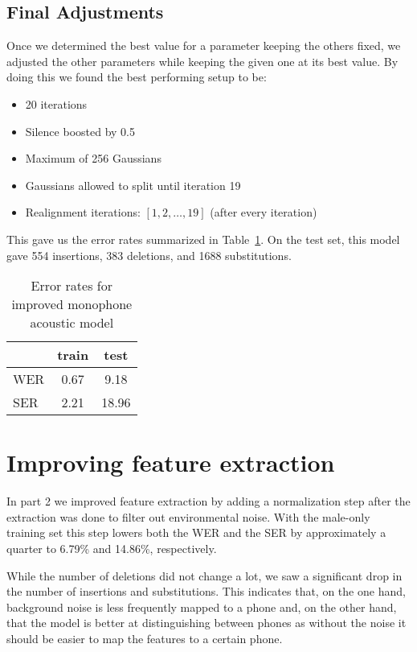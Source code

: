 \documentclass[11pt]{article}
\begin{document}
\subsection{Final Adjustments}
Once we determined the best value for a parameter keeping the others fixed, we
adjusted the other parameters while keeping the given one at its best value.
By doing this we found the best performing setup to be:

\begin{itemize}
  \item 20 iterations
  \item Silence boosted by 0.5
  \item Maximum of 256 Gaussians
  \item Gaussians allowed to split until iteration 19
  \item Realignment iterations: $[1, 2, \ldots, 19]$ (after every iteration)
\end{itemize}

This gave us the error rates summarized in Table~\ref{tab:wer-mono}. On the test
set, this model gave 554 insertions, 383 deletions, and 1688 substitutions.

\begin{table}[h]\centering
  \begin{tabular}{lcc}
    \toprule
    & train & test \\
    \midrule
    WER & 0.67 & 9.18 \\
    SER & 2.21 & 18.96 \\
    \bottomrule
  \end{tabular}
  \caption{Error rates for improved monophone acoustic
  model}\label{tab:wer-mono}
\end{table}

\section{Improving feature extraction}

In part 2 we improved feature extraction by adding a normalization step after
the extraction was done to filter out environmental noise. With the male-only
training set this step lowers both the WER and the SER by approximately a
quarter to 6.79\% and 14.86\%, respectively.

While the number of deletions did not change a lot, we saw a significant drop
in the number of insertions and substitutions. This indicates that, on the one
hand, background noise is less frequently mapped to a phone and, on the other
hand, that the model is better at distinguishing between phones as without the
noise it should be easier to map the features to a certain phone.
\end{document}
